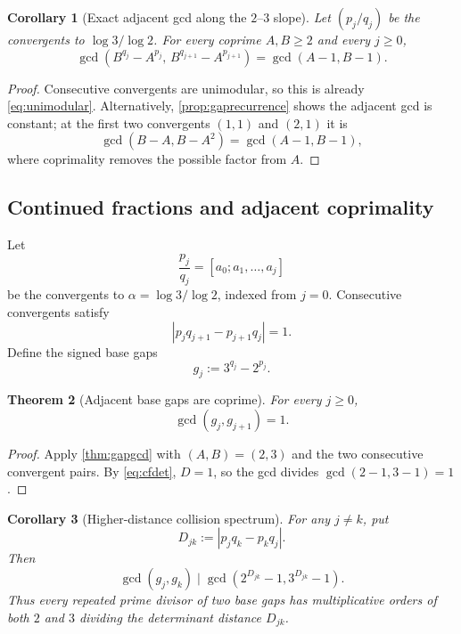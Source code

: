 \documentclass[11pt,oneside]{article}
\newtheorem{theorem}{Theorem}[section]
\newtheorem{corollary}[theorem]{Corollary}
\theoremstyle{definition}
\theoremstyle{remark}
\newcommand{\abs}[1]{\left|#1\right|}
\begin{document}
\begin{corollary}[Exact adjacent gcd along the $2$--$3$ slope]
\label{cor:exactadjacentgeneral}
Let $(p_j/q_j)$ be the convergents to $\log3/\log2$.  For every coprime
$A,B\ge2$ and every $j\ge0$,
\[
 \gcd(B^{q_j}-A^{p_j},\,B^{q_{j+1}}-A^{p_{j+1}})
 =\gcd(A-1,B-1).
\]
\end{corollary}

\begin{proof}
Consecutive convergents are unimodular, so this is already
\eqref{eq:unimodular}.  Alternatively, \cref{prop:gaprecurrence} shows the
adjacent gcd is constant; at the first two convergents $(1,1)$ and $(2,1)$ it
is
\[
 \gcd(B-A,B-A^2)=\gcd(A-1,B-1),
\]
where coprimality removes the possible factor from $A$.
\end{proof}

\subsection{Continued fractions and adjacent coprimality}

Let
\[
  \frac{p_j}{q_j}=[a_0;a_1,\ldots,a_j]
\]
be the convergents to $\alpha=\log3/\log2$, indexed from $j=0$.  Consecutive
convergents satisfy
\begin{equation}
  \abs{p_jq_{j+1}-p_{j+1}q_j}=1.
  \label{eq:cfdet}
\end{equation}
Define the signed base gaps
\begin{equation}
  g_j:=3^{q_j}-2^{p_j}.
  \label{eq:basegap}
\end{equation}

\begin{theorem}[Adjacent base gaps are coprime]
\label{thm:adjacent}
For every $j\ge0$,
\begin{equation}
  \gcd(g_j,g_{j+1})=1.
  \label{eq:adjacentcoprime}
\end{equation}
\end{theorem}

\begin{proof}
Apply \cref{thm:gapgcd} with $(A,B)=(2,3)$ and the two consecutive convergent
pairs.  By \eqref{eq:cfdet}, $D=1$, so the gcd divides
$\gcd(2-1,3-1)=1$.
\end{proof}

\begin{corollary}[Higher-distance collision spectrum]
\label{cor:higherdistance}
For any $j\ne k$, put
\[
  D_{jk}:=\abs{p_jq_k-p_kq_j}.
\]
Then
\[
  \gcd(g_j,g_k)\mid\gcd(2^{D_{jk}}-1,3^{D_{jk}}-1).
\]
Thus every repeated prime divisor of two base gaps has multiplicative orders
of both $2$ and $3$ dividing the determinant distance $D_{jk}$.
\end{corollary}
\end{document}
